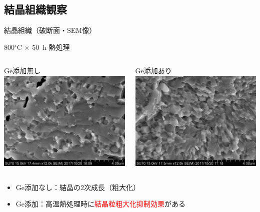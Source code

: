 \documentclass[aspectratio=169, unicode, 10pt]{beamer}
\begin{document}
	\subsection{結晶組織観察}
	\begin{frame}{結晶組織（破断面・SEM像）}
		\begin{block}{800$^\circ$C $\times$ 50~h 熱処理}
			\begin{columns}
				\begin{column}{0.5\linewidth}
					\centering
					Ge添加無し\\
					\includegraphics[width=0.7 \linewidth]{figs/15Zn-sem.jpg}
				\end{column}
				\begin{column}{0.5\linewidth}
					\centering
					Ge添加あり\\
					\includegraphics[width=0.7\linewidth]{figs/14Zn1Ge-sem.jpg}
				\end{column}
			\end{columns}
		\end{block}
		\begin{itemize}
			\item Ge添加なし：結晶の2次成長（粗大化）
			\item Ge添加：高温熱処理時に\textcolor{red}{結晶粒粗大化抑制効果}がある
		\end{itemize}
	\end{frame}
\end{document}
